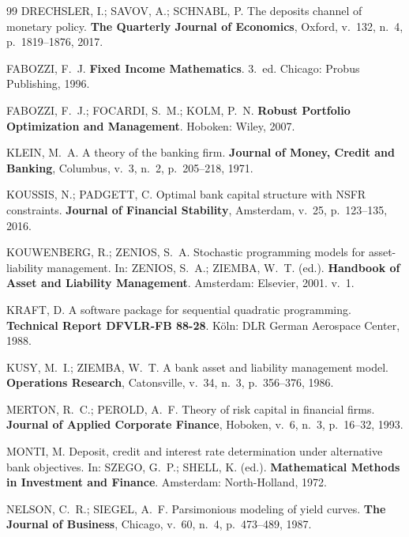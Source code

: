 \documentclass[12pt, a4paper, oneside]{article}
\begin{document}
\begin{thebibliography}{99}
  DRECHSLER, I.; SAVOV, A.; SCHNABL, P.
  The deposits channel of monetary policy.
  \textbf{The Quarterly Journal of Economics}, Oxford, v.~132, n.~4,
  p.~1819--1876, 2017.

  FABOZZI, F.~J.
  \textbf{Fixed Income Mathematics}.
  3.~ed. Chicago: Probus Publishing, 1996.

  FABOZZI, F.~J.; FOCARDI, S.~M.; KOLM, P.~N.
  \textbf{Robust Portfolio Optimization and Management}.
  Hoboken: Wiley, 2007.

  KLEIN, M.~A.
  A theory of the banking firm.
  \textbf{Journal of Money, Credit and Banking}, Columbus, v.~3, n.~2,
  p.~205--218, 1971.

  KOUSSIS, N.; PADGETT, C.
  Optimal bank capital structure with NSFR constraints.
  \textbf{Journal of Financial Stability}, Amsterdam, v.~25,
  p.~123--135, 2016.

  KOUWENBERG, R.; ZENIOS, S.~A.
  Stochastic programming models for asset-liability management.
  In: ZENIOS, S.~A.; ZIEMBA, W.~T. (ed.).
  \textbf{Handbook of Asset and Liability Management}.
  Amsterdam: Elsevier, 2001. v.~1.

  KRAFT, D.
  A software package for sequential quadratic programming.
  \textbf{Technical Report DFVLR-FB 88-28}.
  Köln: DLR German Aerospace Center, 1988.

  KUSY, M.~I.; ZIEMBA, W.~T.
  A bank asset and liability management model.
  \textbf{Operations Research}, Catonsville, v.~34, n.~3,
  p.~356--376, 1986.

  MERTON, R.~C.; PEROLD, A.~F.
  Theory of risk capital in financial firms.
  \textbf{Journal of Applied Corporate Finance}, Hoboken, v.~6, n.~3,
  p.~16--32, 1993.

  MONTI, M.
  Deposit, credit and interest rate determination under alternative bank
  objectives.
  In: SZEGO, G.~P.; SHELL, K. (ed.).
  \textbf{Mathematical Methods in Investment and Finance}.
  Amsterdam: North-Holland, 1972.

  NELSON, C.~R.; SIEGEL, A.~F.
  Parsimonious modeling of yield curves.
  \textbf{The Journal of Business}, Chicago, v.~60, n.~4,
  p.~473--489, 1987.


\end{thebibliography}
\end{document}
